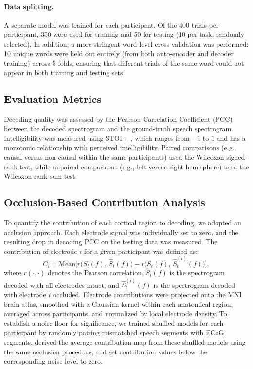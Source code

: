 \documentclass[10pt]{article}
\begin{document}
\paragraph{Data splitting.}
A separate model was trained for each participant. Of the 400 trials per participant, 350 were used for training and 50 for testing (10 per task, randomly selected). In addition, a more stringent word-level cross-validation was performed: 10 unique words were held out entirely (from both auto-encoder and decoder training) across 5 folds, ensuring that different trials of the same word could not appear in both training and testing sets.

\subsection{Evaluation Metrics}

Decoding quality was assessed by the Pearson Correlation Coefficient (PCC) between the decoded spectrogram and the ground-truth speech spectrogram. Intelligibility was measured using STOI+~\cite{taal2011algorithm,relanoiborra2016sepsm}, which ranges from $-1$ to $1$ and has a monotonic relationship with perceived intelligibility. Paired comparisons (e.g., causal versus non-causal within the same participants) used the Wilcoxon signed-rank test, while unpaired comparisons (e.g., left versus right hemisphere) used the Wilcoxon rank-sum test.

\subsection{Occlusion-Based Contribution Analysis}

To quantify the contribution of each cortical region to decoding, we adopted an occlusion approach. Each electrode signal was individually set to zero, and the resulting drop in decoding PCC on the testing data was measured. The contribution of electrode $i$ for a given participant was defined as:
\begin{equation}
C_i = \mathrm{Mean}\bigl[r\bigl(S_t(f),\,\hat{S}_t(f)\bigr) - r\bigl(S_t(f),\,\hat{S}_t^{(i)}(f)\bigr)\bigr],
\end{equation}
where $r(\cdot,\cdot)$ denotes the Pearson correlation, $\hat{S}_t(f)$ is the spectrogram decoded with all electrodes intact, and $\hat{S}_t^{(i)}(f)$ is the spectrogram decoded with electrode $i$ occluded. Electrode contributions were projected onto the MNI brain atlas, smoothed with a Gaussian kernel within each anatomical region, averaged across participants, and normalized by local electrode density. To establish a noise floor for significance, we trained shuffled models for each participant by randomly pairing mismatched speech segments with ECoG segments, derived the average contribution map from these shuffled models using the same occlusion procedure, and set contribution values below the corresponding noise level to zero.
\end{document}
